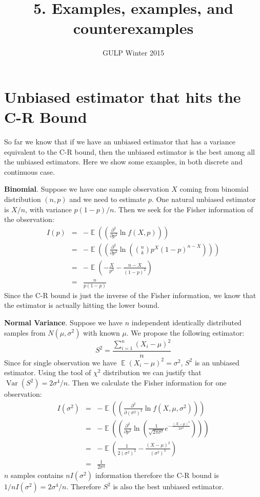 \documentclass[12pt]{article}
\newcommand{\1}{\mathbbm{1}}
\newcommand{\E}{\operatorname{\mathbb{E}}}
\newcommand{\var}[1]{\operatorname{Var}\left(#1\right)}
\begin{document}
\title{5. Examples, examples, and counterexamples}%
\author{GULP Winter 2015} %
\maketitle

\section{Unbiased estimator that hits the C-R Bound}

So far we know that if we have an unbiased estimator that has a variance equivalent to the C-R bound, then the unbiased estimator is the best among all the unbiased estimators. Here we show some examples, in both discrete and continuous case.

\textbf{Binomial}. Suppose we have one sample observation $X$ coming from binomial distribution $(n,p)$ and we need to estimate $p$. One natural unbiased estimator is $X/n$, with variance $p(1-p)/n$. Then we seek for the Fisher information of the observation:
\begin{eqnarray*}
I(p) &=& - \E((\frac{\partial^2}{\partial p^2} \ln f(X,p)))\\& = & - \E((\frac{\partial^2}{\partial p^2} \ln ({n\choose k} p^X (1-p)^{n-X} ))) \\ & = &  -\E ( - \frac{X}{p^2} - \frac{n-X}{(1-p)^2}) \\ &=& \frac{n}{p(1-p)}
\end{eqnarray*}
Since the C-R bound is just the inverse of the Fisher information, we know that the estimator is actually hitting the lower bound.

\textbf{Normal Variance}. Suppose we have $n$ independent identically distributed samples from $N(\mu, \sigma^2)$ with known $\mu$. We propose the following estimator:
$$
S^2 = \frac{\sum_{i=1}^n(X_i -\mu)^2 }{n}
$$
Since for single observation we have $\E (X_i -\mu)^2 = \sigma^2$, $S^2$ is an unbiased estimator. Using the tool of $\chi^2$ distribution we can justify that $\var{S^2} = 2\sigma^4/n$. Then we calculate the Fisher information for one observation:
\begin{eqnarray*}
I(\sigma^2) &=& - \E((\frac{\partial^2}{\partial (\sigma^2)^2} \ln f(X,\mu,\sigma^2)))\\& = & - \E((\frac{\partial^2}{\partial p^2} \ln (\frac{1}{\sqrt{2\pi \sigma^2} }e^{-\frac{(X - \mu)^2}{2\sigma^2}} ))) \\ & =& - \E (\frac{1}{2(\sigma^2)^2} - \frac{(X - \mu)^2}{(\sigma^2)^3})    \\ &=& \frac{1}{2\sigma^4}
\end{eqnarray*}
$n$ samples contains $nI(\sigma^2)$ information therefore the C-R bound is $1/nI(\sigma^2) = 2\sigma^4 /n$. Therefore $S^2$ is also the best unbiased estimator.
\end{document}
